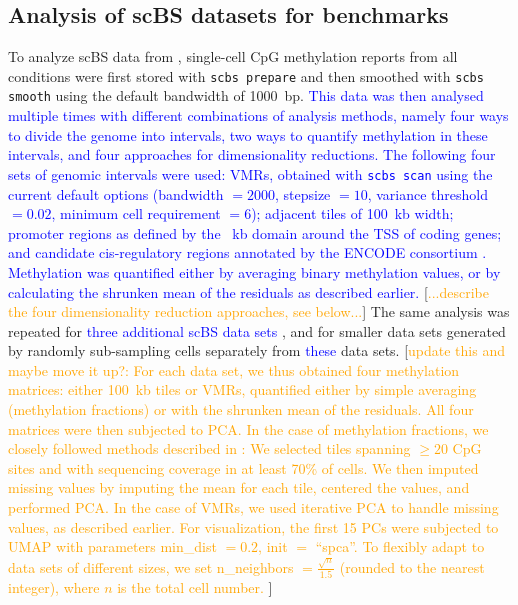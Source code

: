 \documentclass[twocolumn,10pt]{article}
\newcommand{\todo}[1]{[\textcolor{orange}{#1}]}
\newcommand{\new}[1]{\textcolor{blue}{#1}}
\begin{document}
\subsection{Analysis of scBS datasets for benchmarks}
To analyze scBS data from \citet{kremer_scnmt}, single-cell CpG methylation reports from all conditions were first stored with \texttt{scbs prepare} and then smoothed with \texttt{scbs smooth} using the default bandwidth of 1000~bp.
\new{
This data was then analysed multiple times with different combinations of analysis methods, namely four ways to divide the genome into intervals, two ways to quantify methylation in these intervals, and four approaches for dimensionality reductions.
The following four sets of genomic intervals were used:
VMRs, obtained with \texttt{scbs scan} using the current default options (bandwidth $=2000$, stepsize $=10$, variance threshold $= 0.02$, minimum cell requirement $=6$);
adjacent tiles of 100~kb width;
promoter regions as defined by the \textpm2~kb domain around the TSS of coding genes;
and candidate cis-regulatory regions annotated by the ENCODE consortium \citep{encode2020expanded}.
Methylation was quantified either by averaging binary methylation values, or by calculating the shrunken mean of the residuals as described earlier.
}
\todo{...describe the four dimensionality reduction approaches, see below...}
The same analysis was repeated for \new{three additional scBS data sets \citep{luo2017single, bian2018single, argelaguet2019gastru}}, and for smaller data sets generated by randomly sub-sampling cells separately from \new{these} data sets.
\todo{update this and maybe move it up?: For each data set, we thus obtained four methylation matrices:
either 100~kb tiles or VMRs, quantified either by simple averaging (methylation fractions) or with the shrunken mean of the residuals.
All four matrices were then subjected to PCA.
In the case of methylation fractions, we closely followed methods described in \citet{luo2017single}:
We selected tiles spanning $\ge20$ CpG sites and with sequencing coverage in at least 70\% of cells.
We then imputed missing values by imputing the mean for each tile, centered the values, and performed PCA.
In the case of VMRs, we used iterative PCA to handle missing values, as described earlier.
For visualization, the first 15 PCs were subjected to UMAP with parameters min\_dist $=0.2$, init $=$ ``spca''.
To flexibly adapt to data sets of different sizes, we set n\_neighbors  $=\frac{\sqrt{n}}{1.5}$ (rounded to the nearest integer), where $n$ is the total cell number.
}
\end{document}
